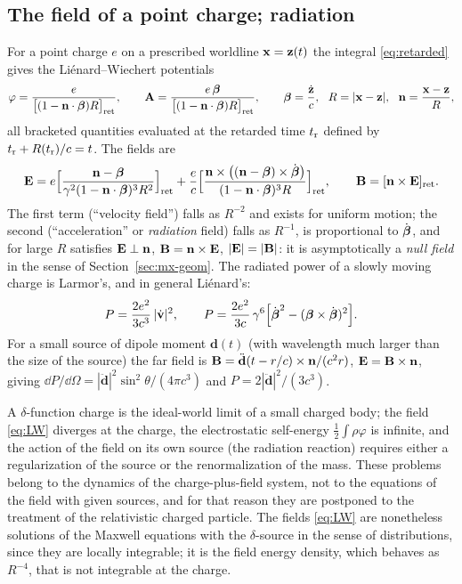 \subsection{The field of a point charge; radiation}

For a point charge $e$ on a prescribed worldline $\mathbf{x}=\mathbf z(t)$ the
integral \eqref{eq:retarded} gives the Liénard--Wiechert potentials
\begin{equation}
\varphi=\frac{e}{\big[(1-\vn\cdot\vbeta)R\big]_{\rm ret}},\qquad
\vA=\frac{e\,\vbeta}{\big[(1-\vn\cdot\vbeta)R\big]_{\rm ret}},\qquad
\vbeta=\frac{\dot{\mathbf z}}{c},\ \ R=|\vx-\mathbf z|,\ \ \vn=\frac{\vx-\mathbf z}{R},
\end{equation}
all bracketed quantities evaluated at the retarded time $t_{\rm r}$ defined by
$t_{\rm r}+R(t_{\rm r})/c=t$.  The fields are
\begin{equation}\label{eq:LW}
\mathbf{E}=e\Big[\frac{\mathbf{n}-\boldsymbol{\beta}}{\gamma^2(1-\mathbf{n}\cdot\boldsymbol{\beta})^3R^2}\Big]_{\rm ret}
+\frac ec\Big[\frac{\mathbf{n}\times\big((\mathbf{n}-\boldsymbol{\beta})\times\dot{\boldsymbol{\beta}}\big)}{(1-\mathbf{n}\cdot\boldsymbol{\beta})^3R}\Big]_{\rm ret},\qquad
\mathbf{B}=[\mathbf{n}\times\mathbf{E}]_{\rm ret}.
\end{equation}
The first term (``velocity field'') falls as $R^{-2}$ and exists for
uniform motion; the second (``acceleration'' or \emph{radiation}
field) falls as $R^{-1}$, is proportional to $\dot{\boldsymbol{\beta}}$, and for large $R$
satisfies $\mathbf{E}\perp\mathbf{n}$, $\mathbf{B}=\mathbf{n}\times\mathbf{E}$, $|\mathbf{E}|=|\mathbf{B}|$: it is
asymptotically a \emph{null field} in the sense of
Section~\ref{sec:mx-geom}.  The radiated power of a slowly moving charge is Larmor's,
and in general Liénard's:
\begin{equation}
P=\frac{2e^2}{3c^3}\,|\dot{\mathbf{v}}|^2,\qquad
P=\frac{2e^2}{3c}\,\gamma^6\Big[\dot{\boldsymbol{\beta}}^2-(\boldsymbol{\beta}\times\dot{\boldsymbol{\beta}})^2\Big].
\end{equation}
For a small source of dipole moment $\mathbf d(t)$ (with wavelength much larger than the
size of the source) the far field is $\mathbf{B}=\ddot{\mathbf d}(t-r/c)\times\mathbf{n}/(c^2r)$,
$\mathbf{E}=\mathbf{B}\times\mathbf{n}$, giving $\dd P/\dd\Omega=|\ddot{\mathbf d}|^2\sin^2\theta/(4\pi c^3)$
and $P=2|\ddot{\mathbf d}|^2/(3c^3)$.

\begin{remark}
A $\delta$-function charge is the ideal-world limit of a small charged
body; the field \eqref{eq:LW} diverges at the charge, the electrostatic
self-energy $\tfrac12\!\int\!\rho\varphi$ is infinite, and the action of
the field on its own source (the radiation reaction) requires either a
regularization of the source or the renormalization of the mass.  These
problems belong to the dynamics of the charge-plus-field system, not to
the equations of the field with given sources, and for that reason they are
postponed to the treatment of the relativistic charged particle.  The fields \eqref{eq:LW} are
nonetheless solutions of the Maxwell equations with the $\delta$-source
in the sense of distributions, since they are locally integrable; it is
the field energy density, which behaves as $R^{-4}$, that is not
integrable at the charge.
\end{remark}

